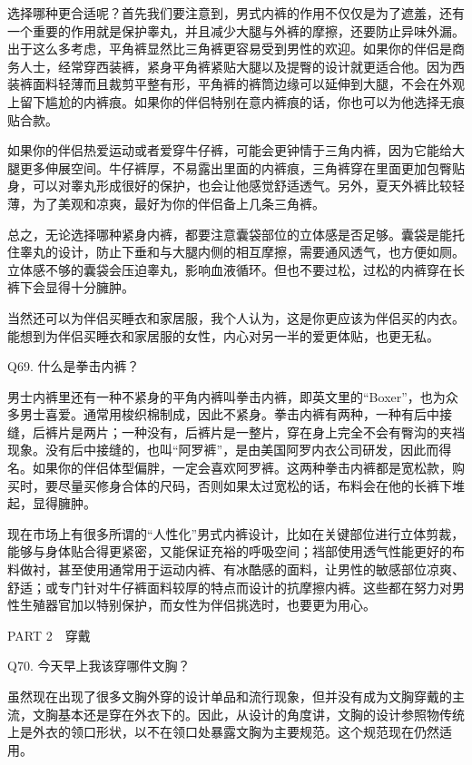 \documentclass[12pt,UTF8]{ctexbook}
\begin{document}
选择哪种更合适呢？首先我们要注意到，男式内裤的作用不仅仅是为了遮羞，还有一个重要的作用就是保护睾丸，并且减少大腿与外裤的摩擦，还要防止异味外漏。出于这么多考虑，平角裤显然比三角裤更容易受到男性的欢迎。如果你的伴侣是商务人士，经常穿西装裤，紧身平角裤紧贴大腿以及提臀的设计就更适合他。因为西装裤面料轻薄而且裁剪平整有形，平角裤的裤筒边缘可以延伸到大腿，不会在外观上留下尴尬的内裤痕。如果你的伴侣特别在意内裤痕的话，你也可以为他选择无痕贴合款。

如果你的伴侣热爱运动或者爱穿牛仔裤，可能会更钟情于三角内裤，因为它能给大腿更多伸展空间。牛仔裤厚，不易露出里面的内裤痕，三角裤穿在里面更加包臀贴身，可以对睾丸形成很好的保护，也会让他感觉舒适透气。另外，夏天外裤比较轻薄，为了美观和凉爽，最好为你的伴侣备上几条三角裤。


总之，无论选择哪种紧身内裤，都要注意囊袋部位的立体感是否足够。囊袋是能托住睾丸的设计，防止下垂和与大腿内侧的相互摩擦，需要通风透气，也方便如厕。立体感不够的囊袋会压迫睾丸，影响血液循环。但也不要过松，过松的内裤穿在长裤下会显得十分臃肿。

当然还可以为伴侣买睡衣和家居服，我个人认为，这是你更应该为伴侣买的内衣。能想到为伴侣买睡衣和家居服的女性，内心对另一半的爱更体贴，也更无私。





Q69. 什么是拳击内裤？


男士内裤里还有一种不紧身的平角内裤叫拳击内裤，即英文里的“Boxer”，也为众多男士喜爱。通常用梭织棉制成，因此不紧身。拳击内裤有两种，一种有后中接缝，后裤片是两片；一种没有，后裤片是一整片，穿在身上完全不会有臀沟的夹裆现象。没有后中接缝的，也叫“阿罗裤”，是由美国阿罗内衣公司研发，因此而得名。如果你的伴侣体型偏胖，一定会喜欢阿罗裤。这两种拳击内裤都是宽松款，购买时，要尽量买修身合体的尺码，否则如果太过宽松的话，布料会在他的长裤下堆起，显得臃肿。

现在市场上有很多所谓的“人性化”男式内裤设计，比如在关键部位进行立体剪裁，能够与身体贴合得更紧密，又能保证充裕的呼吸空间；裆部使用透气性能更好的布料做衬，甚至使用通常用于运动内裤、有冰酷感的面料，让男性的敏感部位凉爽、舒适；或专门针对牛仔裤面料较厚的特点而设计的抗摩擦内裤。这些都在努力对男性生殖器官加以特别保护，而女性为伴侣挑选时，也要更为用心。





PART 2　穿戴





Q70. 今天早上我该穿哪件文胸？


虽然现在出现了很多文胸外穿的设计单品和流行现象，但并没有成为文胸穿戴的主流，文胸基本还是穿在外衣下的。因此，从设计的角度讲，文胸的设计参照物传统上是外衣的领口形状，以不在领口处暴露文胸为主要规范。这个规范现在仍然适用。
\end{document}
